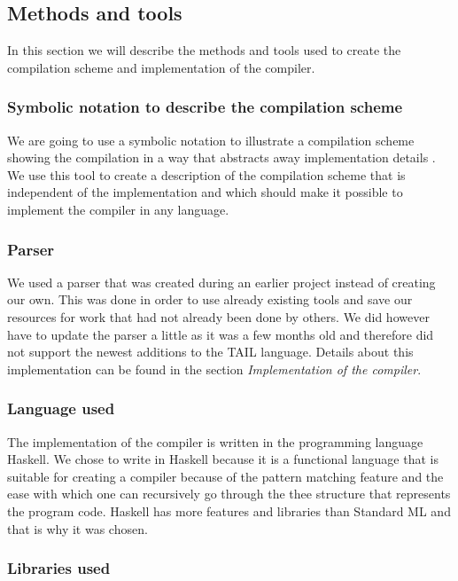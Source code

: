\documentclass[11pt]{article}
\begin{document}
\subsection{Methods and tools}
In this section we will describe the methods and tools used to create the compilation scheme and implementation of the compiler. 

\subsubsection{Symbolic notation to describe the compilation scheme}
We are going to use a symbolic notation to illustrate a compilation scheme showing the compilation in a way
that abstracts away implementation details \cite{MartinElsmanNotation}.
We use this tool to create a description of the compilation scheme that is independent of the implementation and
which should make it possible to implement the compiler in any language.

\subsubsection{Parser}
We used a parser that was created during an earlier project \cite{APLACC} instead of creating our own.
This was done in order to use already existing tools and save our resources for work that had not already been done by others.
We did however have to update the parser a little as it was a few months old and therefore did not support the
newest additions to the TAIL language.
Details about this implementation can be found in the section \textit{Implementation of the compiler}. 

\subsubsection{Language used}
The implementation of the compiler is written in the programming language Haskell.
We chose to write in Haskell because it is a functional language that is suitable for creating a compiler because of the 
pattern matching feature and the ease with which one can recursively go through the thee structure that 
represents the program code. Haskell has more features and libraries than Standard ML and that is why it was chosen. 

\subsubsection{Libraries used}
\end{document}

